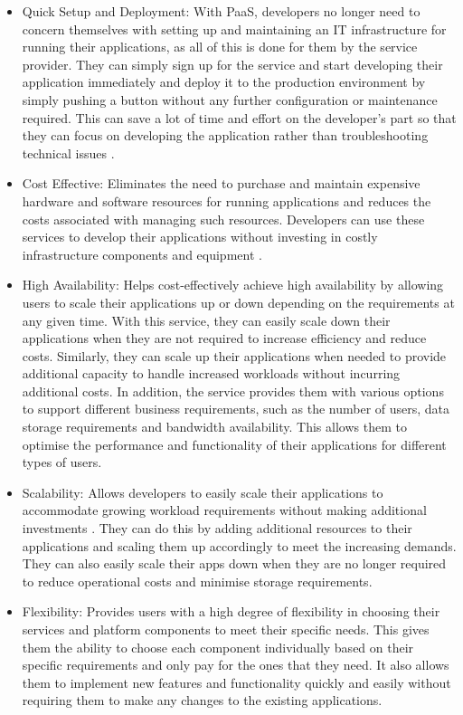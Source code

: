 \documentclass[BIF,Master,nenglish]{twbook}
\begin{document}
\begin{itemize}
\item Quick Setup and Deployment: With PaaS, developers no longer need to concern themselves with setting up and maintaining an IT infrastructure for running their applications, as all of this is done for them by the service provider. They can simply sign up for the service and start developing their application immediately and deploy it to the production environment by simply pushing a button without any further configuration or maintenance required. This can save a lot of time and effort on the developer's part so that they can focus on developing the application rather than troubleshooting technical issues \cite{law2008}.

\item Cost Effective: Eliminates the need to purchase and maintain expensive hardware and software resources for running applications and reduces the costs associated with managing such resources. Developers can use these services to develop their applications without investing in costly infrastructure components and equipment \cite{gai2014}.

\item High Availability: Helps cost-effectively achieve high availability by allowing users to scale their applications up or down depending on the requirements at any given time. With this service, they can easily scale down their applications when they are not required to increase efficiency and reduce costs. Similarly, they can scale up their applications when needed to provide additional capacity to handle increased workloads without incurring additional costs. In addition, the service provides them with various options to support different business requirements, such as the number of users, data storage requirements and bandwidth availability. This allows them to optimise the performance and functionality of their applications for different types of users. 

\item Scalability: Allows developers to easily scale their applications to accommodate growing workload requirements without making additional investments \cite{law2008}. They can do this by adding additional resources to their applications and scaling them up accordingly to meet the increasing demands. They can also easily scale their apps down when they are no longer required to reduce operational costs and minimise storage requirements.

\item Flexibility: Provides users with a high degree of flexibility in choosing their services and platform components to meet their specific needs. This gives them the ability to choose each component individually based on their specific requirements and only pay for the ones that they need. It also allows them to implement new features and functionality quickly and easily without requiring them to make any changes to the existing applications. 
\end{itemize}
\end{document}
